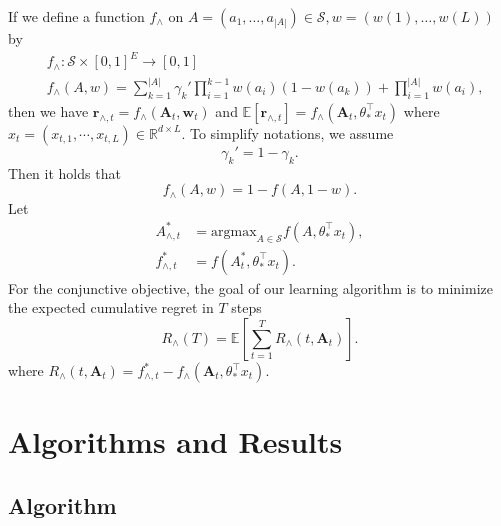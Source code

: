 \documentclass{article}
\newcommand{\EE}{\mathbb{E}}
\newcommand{\RR}{\mathbb{R}}
\newcommand{\bA}{\mathbf{A}}
\newcommand{\br}{\mathbf{r}}
\newcommand{\bw}{\mathbf{w}}
\newcommand{\cS}{\mathcal{S}}
\newcommand{\argmax}{\mathrm{argmax}}
\newcommand{\abs}[1]{\left| #1 \right|}
\begin{document}
If we define a function $f_{\wedge}$ on $A = (a_1, \ldots, a_{\abs{A}}) \in \cS, w = (w(1), \ldots, w(L))$ by
\begin{align}
&f_{\wedge} : \cS \times [0,1]^E \to [0,1] \nonumber \\
&f_{\wedge}(A,w) = \sum_{k = 1}^{\abs{A}} \gamma_k' \prod_{i = 1}^{k - 1} w(a_i)
 (1 - w(a_k)) + \prod_{i=1}^{\abs{A}}w(a_i),
 \label{eq:functionfstar}
\end{align}
then we have $\br_{\wedge, t} = f_{\wedge}(\bA_t, \bw_t)$ and $\EE[\br_{\wedge, t}] = f_{\wedge}(\bA_t, \theta_{\ast}^{\top}x_t)$ where $x_t = (x_{t,1}, \cdots, x_{t,L}) \in \RR^{d \times L}$. To simplify notations, we assume 
$$
\gamma_k' = 1 - \gamma_k.
$$
Then it holds that
\begin{equation}
\label{eq:ConDisRelation}
f_{\wedge}(A, w) = 1 - f(A, 1 - w).
\end{equation}
Let 
\begin{align*}
A_{\wedge, t}^{\ast} &= \argmax_{A\in \cS} f(A,\theta_{\ast}^{\top}x_t),\\
f_{\wedge, t}^{\ast} &= f(A_t^{\ast}, \theta_{\ast}^{\top}x_t).
\end{align*}
For the conjunctive objective, the goal of our learning algorithm is to minimize the expected cumulative regret in $T$ steps
$$
R_{\wedge}(T) = \EE\left[\sum_{t=1}^T R_{\wedge}(t, \bA_t)\right].
$$
where $R_{\wedge}(t, \bA_t) = f_{\wedge, t}^{\ast} - f_{\wedge}(\bA_t, \theta_{\ast}^{\top}x_t)$.



\section{Algorithms and Results}

\subsection{Algorithm}
	
\end{document}
